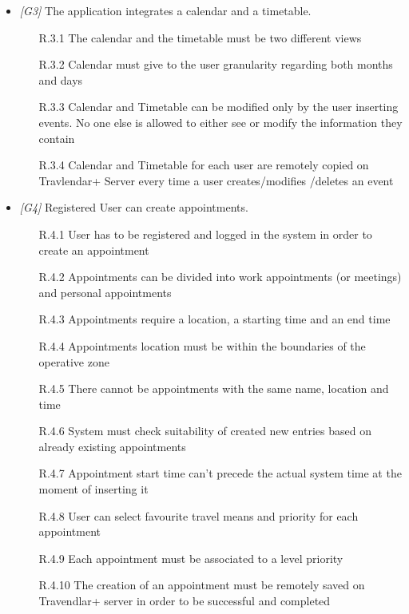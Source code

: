 \begin{itemize}
                  
\item \textit{[G3]} The application integrates a calendar and a timetable.

                  \begin{itemize}
                  
                  \item [R.3.1] The calendar and the timetable must be two different views 
                  \item [R.3.2] Calendar must give to the user granularity regarding both months and days
                  \item [R.3.3] Calendar and Timetable can be modified only by the user inserting events. No one else is allowed to either see or modify the information they contain
                  \item [R.3.4] Calendar and Timetable for each user are remotely copied on Travlendar+ Server every time a user creates/modifies /deletes an event
                        
                  \end{itemize}
                  
\item \textit{[G4]} Registered User can create appointments.

 \begin{itemize}
                        \item [R.4.1] User has to be registered and logged in the system in order to create an
appointment
                        \item [R.4.2] Appointments can be divided into work appointments (or meetings) and personal appointments
                        \item [R.4.3] Appointments require a location, a starting time and an end time
                        \item [R.4.4] Appointments location must be within the boundaries of the operative zone
                        \item [R.4.5] There cannot be appointments with the same name, location and time
                        \item [R.4.6] System must check suitability of created new entries based on already existing appointments
                        \item [R.4.7] Appointment start time can't precede the actual system time at the moment of inserting it                                 														\item [R.4.8] User can select favourite travel means and priority for each appointment
                        \item [R.4.9] Each appointment must be associated to a level priority
                        \item [R.4.10] The creation of an appointment must be remotely saved on Travendlar+ server in order to be successful and completed
                        

\end{itemize}
\end{itemize}
